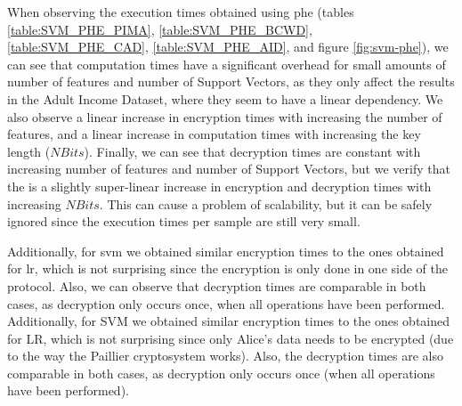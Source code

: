 When observing the execution times obtained using \ac{phe} (tables \ref{table:SVM_PHE_PIMA}, \ref{table:SVM_PHE_BCWD}, \ref{table:SVM_PHE_CAD}, \ref{table:SVM_PHE_AID}, and figure \ref{fig:svm-phe}), we can see that computation times have a significant overhead for small amounts of number of features and number of Support Vectors, as they only affect the results in the Adult Income Dataset, where they seem to have a linear dependency. 
We also observe a linear increase in encryption times with increasing the number of features, and a linear increase in computation times with increasing the key length ($NBits$).
Finally, we can see that decryption times are constant with increasing number of features and number of Support Vectors, but we verify that the is a slightly super-linear increase in encryption and decryption times with increasing $NBits$. This can cause a problem of scalability, but it can be safely ignored since the execution times per sample are still very small.

Additionally, for \ac{svm} we obtained similar encryption times to the ones obtained for \ac{lr}, which is not surprising since the encryption is only done in one side of the protocol. Also, we can observe that decryption times are comparable in both cases, as decryption only occurs once, when all operations have been performed.
Additionally, for SVM we obtained similar encryption times to the ones obtained for LR, which is not surprising since only Alice’s data needs to be encrypted (due to the way the Paillier cryptosystem works). Also, the decryption times are also comparable in both cases, as decryption only occurs once (when all operations have been performed).


